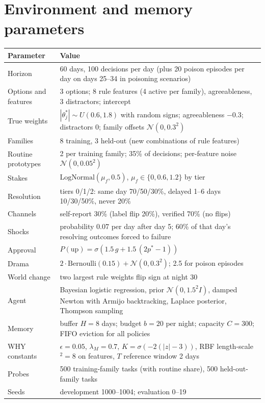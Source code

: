 \section{Environment and memory parameters}
\label{app:params}
\begin{table}[H]
\centering\small
\begin{tabular}{@{}lp{9.6cm}@{}}
\toprule
Parameter & Value\\
\midrule
Horizon & 60 days, 100 decisions per day (plus 20 poison episodes per day on days 25--34 in poisoning scenarios)\\
Options and features & 3 options; 8 rule features (4 active per family), agreeableness, 3 distractors; intercept\\
True weights & $|\theta^\ast_j|\sim U(0.6,1.8)$ with random signs; agreeableness $-0.3$; distractors 0; family offsets $\mathcal N(0,0.3^2)$\\
Families & 8 training, 3 held-out (new combinations of rule features)\\
Routine prototypes & 2 per training family; 35\% of decisions; per-feature noise $\mathcal N(0,0.05^2)$\\
Stakes & $\text{LogNormal}(\mu_f,0.5)$, $\mu_f\in\{0,0.6,1.2\}$ by tier\\
Resolution & tiers 0/1/2: same day 70/50/30\%, delayed 1--6 days 10/30/50\%, never 20\%\\
Channels & self-report 30\% (label flip 20\%), verified 70\% (no flips)\\
Shocks & probability 0.07 per day after day 5; 60\% of that day's resolving outcomes forced to failure\\
Approval & $P(\text{up})=\sigma(1.5\,g+1.5\,(2p^\ast-1))$\\
Drama & $2\cdot\text{Bernoulli}(0.15)+\mathcal N(0,0.3^2)$; 2.5 for poison episodes\\
World change & two largest rule weights flip sign at night 30\\
Agent & Bayesian logistic regression, prior $\mathcal N(0,1.5^2I)$, damped Newton with Armijo backtracking, Laplace posterior, Thompson sampling\\
Memory & buffer $H=8$ days; budget $b=20$ per night; capacity $C=300$; FIFO eviction for all policies\\
WHY constants & $\epsilon=0.05$, $\lambda_M=0.7$, $K=\sigma(-2(|z|-3))$, RBF length-scale$^2=8$ on features, $T$ reference window 2 days\\
Probes & 500 training-family tasks (with routine share), 500 held-out-family tasks\\
Seeds & development 1000--1004; evaluation 0--19\\
\bottomrule
\end{tabular}
\end{table}

